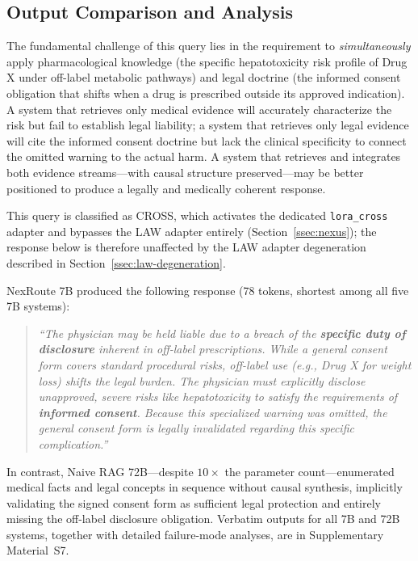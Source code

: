\documentclass[a4paper,fleql]{cas-sc}
\begin{document}
\subsection{Output Comparison and Analysis}
\label{ssec:output}
The fundamental challenge of this query lies in the requirement to
\emph{simultaneously} apply pharmacological knowledge (the specific
hepatotoxicity risk profile of Drug X under off-label metabolic pathways) and
legal doctrine (the informed consent obligation that shifts when a drug is
prescribed outside its approved indication). A system that retrieves only
medical evidence will accurately characterize the risk but fail to establish
legal liability; a system that retrieves only legal evidence will cite the
informed consent doctrine but lack the clinical specificity to connect the
omitted warning to the actual harm. A system that retrieves and integrates both evidence streams---with causal
structure preserved---may be better positioned to produce a legally and
medically coherent response.

This query is classified as CROSS, which activates the dedicated \texttt{lora\_cross}
adapter and bypasses the LAW adapter entirely (Section~\ref{ssec:nexus}); the response
below is therefore unaffected by the LAW adapter degeneration described in
Section~\ref{ssec:law-degeneration}.

NexRoute 7B produced the following response (78 tokens, shortest among all five 7B systems):
\begin{quote}\small
\textit{``The physician may be held liable due to a breach of the \textbf{specific duty of disclosure} inherent in off-label prescriptions. While a general consent form covers standard procedural risks, off-label use (e.g., Drug X for weight loss) shifts the legal burden. The physician must explicitly disclose unapproved, severe risks like hepatotoxicity to satisfy the requirements of \textbf{informed consent}. Because this specialized warning was omitted, the general consent form is legally invalidated regarding this specific complication.''}
\end{quote}
In contrast, Naive RAG 72B---despite $10\times$ the parameter count---enumerated medical facts and legal concepts in sequence without causal synthesis, implicitly validating the signed consent form as sufficient legal protection and entirely missing the off-label disclosure obligation. Verbatim outputs for all 7B and 72B systems, together with detailed failure-mode analyses, are in Supplementary Material~S7.
\end{document}
